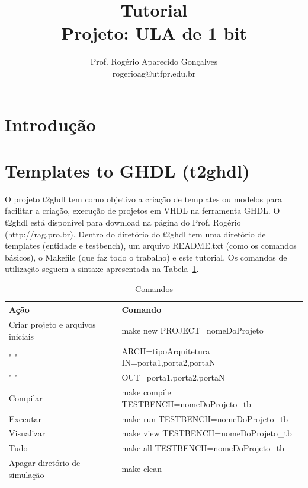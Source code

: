 \documentclass[a4paper,10pt]{report}
\title{Tutorial \\ Projeto: ULA de 1 bit}
\author{Prof. Rogério Aparecido Gonçalves \\ rogerioag@utfpr.edu.br}
\begin{document}
\maketitle
\pagestyle{plain} %
\cleardoublepage


\setcounter{chapter}{1}
\setcounter{section}{0}


\section{Introdução}

\section{Templates to GHDL (t2ghdl)}
O projeto t2ghdl tem como objetivo a criação de templates ou modelos para facilitar a criação, execução de projetos em VHDL na ferramenta GHDL.
O t2ghdl está disponível para download na página do Prof. Rogério (http://rag.pro.br).
Dentro do diretório do t2ghdl tem uma diretório de templates (entidade e testbench), um arquivo README.txt (como os comandos básicos), o Makefile (que faz todo o trabalho) e este tutorial.
Os comandos de utilização seguem a sintaxe apresentada na Tabela~\ref{tab:comandos_t2ghdl}.

\begin{table}[H]
\centering
\caption{Comandos} %
\begin{tabular}{ll} %
\hline %
Ação & Comando \\ %
\hline
\hline
Criar projeto e arquivos iniciais & make new PROJECT=nomeDoProjeto \\
" " & ARCH=tipoArquitetura IN=porta1,porta2,portaN \\ 
" " & OUT=porta1,porta2,portaN \\
Compilar & make compile TESTBENCH=nomeDoProjeto\_tb \\
Executar & make run TESTBENCH=nomeDoProjeto\_tb \\
Visualizar & make view TESTBENCH=nomeDoProjeto\_tb \\
Tudo & make all TESTBENCH=nomeDoProjeto\_tb \\
Apagar diretório de simulação & make clean \\
\hline
\end{tabular}
\label{tab:comandos_t2ghdl}
\end{table}
\end{document}
